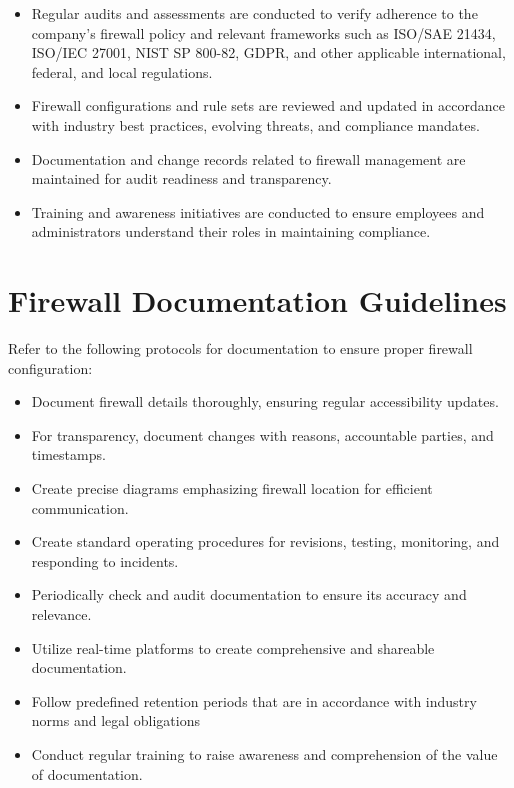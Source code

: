 \begin{itemize}
    \item Regular audits and assessments are conducted to verify adherence to the company’s firewall policy and relevant frameworks such as ISO/SAE 21434, ISO/IEC 27001, NIST SP 800-82, GDPR, and other applicable international, federal, and local regulations.
    
    \item Firewall configurations and rule sets are reviewed and updated in accordance with industry best practices, evolving threats, and compliance mandates.
    
    \item Documentation and change records related to firewall management are maintained for audit readiness and transparency.
    
    \item Training and awareness initiatives are conducted to ensure employees and administrators understand their roles in maintaining compliance.

\end{itemize}
\section{Firewall Documentation Guidelines}
Refer to the following protocols for documentation to ensure proper firewall configuration: 

\begin{itemize}
    \item Document firewall details thoroughly, ensuring regular accessibility updates.
    
    \item For transparency, document changes with reasons, accountable parties, and timestamps.
    
    \item Create precise diagrams emphasizing firewall location for efficient communication.

    \item Create standard operating procedures for revisions, testing, monitoring, and responding to incidents.

    \item Periodically check and audit documentation to ensure its accuracy and relevance.

    \item Utilize real-time platforms to create comprehensive and shareable documentation.
    
    \item Follow predefined retention periods that are in accordance with industry norms and legal obligations

    \item Conduct regular training to raise awareness and comprehension of the value of documentation.


\end{itemize}

